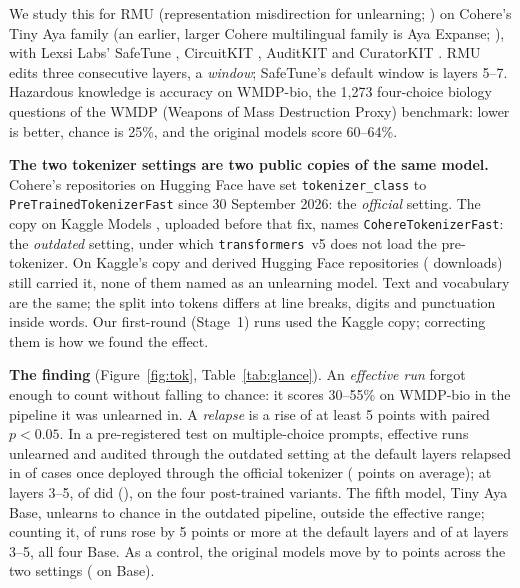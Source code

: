 \documentclass[11pt]{article}
\newcommand{\wmdp}{WMDP-bio}
\begin{document}
We study this for RMU (representation misdirection for unlearning; \citealp{li2024wmdp}) on Cohere's Tiny Aya family \citep{salamanca2026tinyaya} (an earlier, larger Cohere multilingual family is Aya Expanse; \citealp{dang2024ayaexpanse}), with Lexsi Labs' SafeTune \citep{seth2026safetune,safetune}, CircuitKIT \citep{seth2026circuitkit,circuitkit}, AuditKIT \citep{arora2026auditkit,auditkit} and CuratorKIT \citep{bhattacharjee2026curatorkit,curatorkit}. RMU edits three consecutive layers, a \emph{window}; SafeTune's default window is layers 5--7. Hazardous knowledge is accuracy on \wmdp{}, the 1,273 four-choice biology questions of the WMDP (Weapons of Mass Destruction Proxy) benchmark: lower is better, chance is 25\%, and the original models score 60--64\%.

\textbf{The two tokenizer settings are two public copies of the same model.} Cohere's repositories on Hugging Face \citep{hfhub} have set \texttt{tokenizer\_class} to \texttt{PreTrainedTokenizerFast} since 30 September 2026: the \emph{official} setting. The copy on Kaggle Models \citep{kaggletinyaya}, uploaded before that fix, names \texttt{CohereTokenizerFast}: the \emph{outdated} setting, under which \texttt{transformers}~v5 \citep{wolf2020transformers} does not load the pre-tokenizer. On \surveyDate{} Kaggle's copy and \surveyOutdatedOthers{} derived Hugging Face repositories (\surveyDownloads{} downloads) still carried it, none of them named as an unlearning model. Text and vocabulary are the same; the split into tokens differs at line breaks, digits and punctuation inside words. Our first-round (Stage~1) runs used the Kaggle copy; correcting them is how we found the effect.

\textbf{The finding} (Figure~\ref{fig:tok}, Table~\ref{tab:glance}). An \emph{effective run} forgot enough to count without falling to chance: it scores 30--55\% on \wmdp{} in the pipeline it was unlearned in. A \emph{relapse} is a rise of at least 5 points with paired $p<0.05$. In a pre-registered test on multiple-choice prompts, effective runs unlearned and audited through the outdated setting at the default layers relapsed in \stwoDefaultRel{} of \stwoDefaultN{} cases once deployed through the official tokenizer (\stwoDefaultMean{} points on average); at layers 3--5, \stwoShallowRel{} of \stwoShallowN{} did (\stwoShallowMean), on the four post-trained variants. The fifth model, Tiny Aya Base, unlearns to chance in the outdated pipeline, outside the effective range; counting it, \stwoAllDefault{} of \stwoAllN{} runs rose by 5 points or more at the default layers and \stwoAllShallow{} of \stwoAllN{} at layers 3--5, all four Base. As a control, the original models move by \stwoOrigLow{} to \stwoOrigHigh{} points across the two settings (\stwoOrigBase{} on Base).
\end{document}
